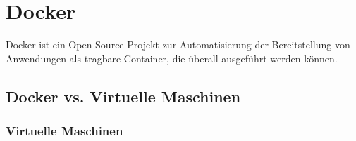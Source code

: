 




\section{Docker}\label{sec:docker}

Docker ist ein Open-Source-Projekt zur Automatisierung der Bereitstellung von Anwendungen als tragbare Container, die überall ausgeführt werden können. 

\subsection{Docker vs. Virtuelle Maschinen}\label{sec:docker-vm}

\subsubsection{Virtuelle Maschinen}

